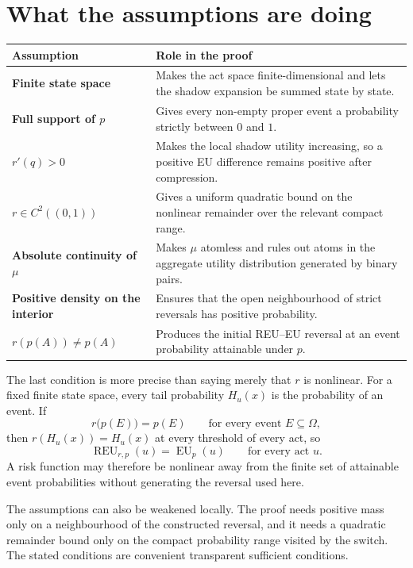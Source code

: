 \documentclass[11pt,a4paper]{article}
\theoremstyle{definition}
\newcommand{\REU}{\operatorname{REU}}
\newcommand{\EU}{\operatorname{EU}}
\begin{document}
\section{What the assumptions are doing}

\begin{center}
\renewcommand{\arraystretch}{1.3}
\begin{tabularx}{\textwidth}{>{\raggedright\arraybackslash\bfseries}p{}X}
\toprule
Assumption & Role in the proof \\
\midrule
Finite state space & Makes the act space finite-dimensional and lets the shadow expansion be summed state by state. \\
Full support of $p$ & Gives every non-empty proper event a probability strictly between $0$ and $1$. \\
$r'(q)>0$ & Makes the local shadow utility increasing, so a positive EU difference remains positive after compression. \\
$r\in C^2((0,1))$ & Gives a uniform quadratic bound on the nonlinear remainder over the relevant compact range. \\
Absolute continuity of $\mu$ & Makes $\mu$ atomless and rules out atoms in the aggregate utility distribution generated by binary pairs. \\
Positive density on the interior & Ensures that the open neighbourhood of strict reversals has positive probability. \\
$r(p(A))\neq p(A)$ & Produces the initial REU--EU reversal at an event probability attainable under $p$. \\
\bottomrule
\end{tabularx}
\end{center}

The last condition is more precise than saying merely that $r$ is nonlinear.
For a fixed finite state space, every tail probability $H_u(x)$ is the
probability of an event. If
\[
 r\bigl(p(E)\bigr)=p(E)
 \qquad\text{for every event }E\subseteq\Omega,
\]
then $r(H_u(x))=H_u(x)$ at every threshold of every act, so
\[
 \REU_{r,p}(u)=\EU_p(u)
 \qquad\text{for every act }u.
\]
A risk function may therefore be nonlinear away from the finite set of
attainable event probabilities without generating the reversal used here.

The assumptions can also be weakened locally. The proof needs positive mass
only on a neighbourhood of the constructed reversal, and it needs a quadratic
remainder bound only on the compact probability range visited by the switch.
The stated conditions are convenient transparent sufficient conditions.
\end{document}
